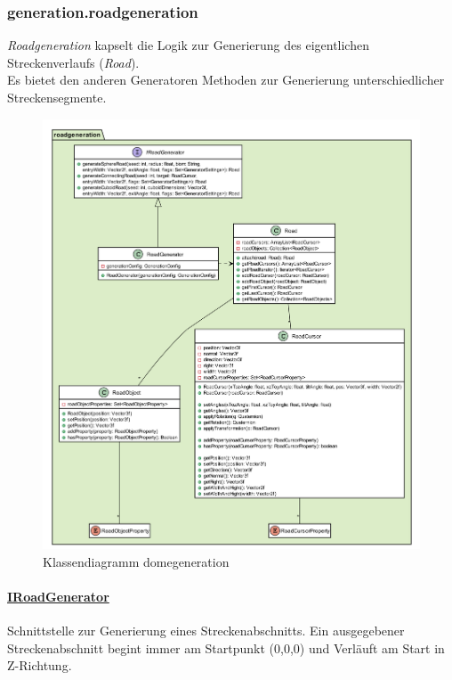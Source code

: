 \subsubsection{generation.roadgeneration}
    \textit{Roadgeneration} kapselt die Logik zur Generierung des eigentlichen Streckenverlaufs (\textit{Road}).\\
    Es bietet den anderen Generatoren Methoden zur Generierung unterschiedlicher Streckensegmente.\par

    \begin{figure}[htbp]
        \centering
        \includegraphics[width=0.9\linewidth]{./Generierung/Bilder/roadgeneration.png}
        \caption{Klassendiagramm domegeneration}
    \end{figure}

        \pagebreak
        \paragraph{\underline{IRoadGenerator}} \mbox{}\par
            Schnittstelle zur Generierung eines Streckenabschnitts.
            Ein ausgegebener Streckenabschnitt begint immer am Startpunkt (0,0,0) und Verläuft am Start in Z-Richtung.
            \par
            
